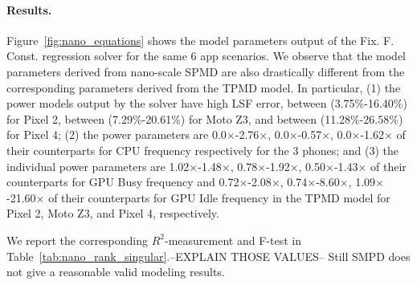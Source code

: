 \paragraph{Results.}
Figure~\ref{fig:nano_equations} shows the model parameters output of the 
Fix. F. Const. regression solver for the same 6 app scenarios.  We
observe that the model parameters derived from nano-scale SPMD are
also drastically different from the corresponding parameters derived
from the TPMD model.  In particular, 
(1) the power models output
by the solver have high LSF error,
between (3.75\%-16.40\%) for Pixel 2,
between (7.29\%-20.61\%) for Moto Z3,
and between (11.28\%-26.58\%) for Pixel 4;
(2) the power parameters are
0.0$\times$-2.76$\times$,
0.0$\times$-0.57$\times$,
0.0$\times$-1.62$\times$ of their
counterparts for CPU frequency respectively for the 3 phones; and
(3) the individual power parameters are
1.02$\times$-1.48$\times$,
0.78$\times$-1.92$\times$,
0.50$\times$-1.43$\times$ of their
counterparts for GPU Busy frequency and
0.72$\times$-2.08$\times$,
0.74$\times$-8.60$\times$,
1.09$\times$-21.60$\times$ of their
counterparts for GPU Idle frequency in the TPMD model for Pixel 2,
Moto Z3, and Pixel 4, respectively.
 
 
{\color{blue}We report the corresponding  $R^2$-measurement and F-test in Table~\ref{tab:nano_rank_singular}.--EXPLAIN THOSE VALUES-- Still SMPD does not give a reasonable valid modeling results.}
 

